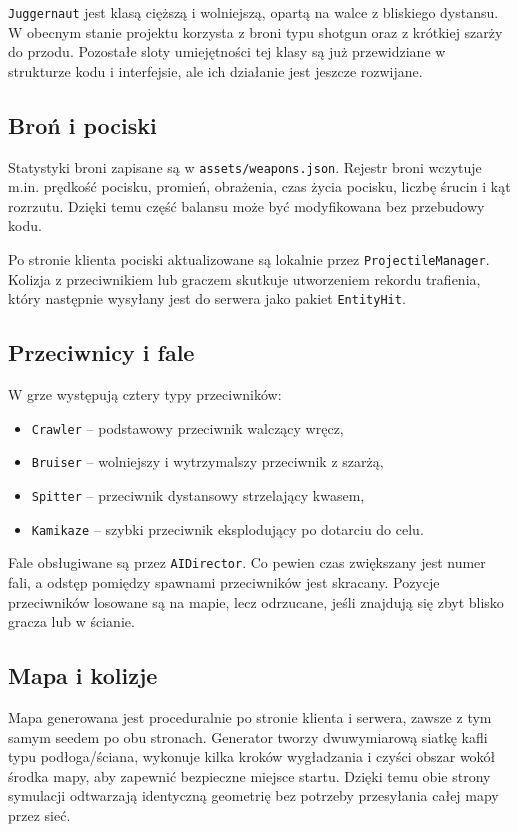 \documentclass[a4paper,12pt]{article}
\begin{document}
\texttt{Juggernaut} jest klasą cięższą i wolniejszą, opartą na walce z bliskiego dystansu. W obecnym stanie projektu korzysta z broni typu shotgun oraz z krótkiej szarży do przodu. Pozostałe sloty umiejętności tej klasy są już przewidziane w strukturze kodu i interfejsie, ale ich działanie jest jeszcze rozwijane.

\subsection{Broń i pociski}
Statystyki broni zapisane są w \texttt{assets/weapons.json}. Rejestr broni wczytuje m.in. prędkość pocisku, promień, obrażenia, czas życia pocisku, liczbę śrucin i kąt rozrzutu. Dzięki temu część balansu może być modyfikowana bez przebudowy kodu.

Po stronie klienta pociski aktualizowane są lokalnie przez \texttt{ProjectileManager}. Kolizja z przeciwnikiem lub graczem skutkuje utworzeniem rekordu trafienia, który następnie wysyłany jest do serwera jako pakiet \texttt{EntityHit}.

\subsection{Przeciwnicy i fale}
W grze występują cztery typy przeciwników:
\begin{itemize}[leftmargin=1.5cm]
    \item \texttt{Crawler} -- podstawowy przeciwnik walczący wręcz,
    \item \texttt{Bruiser} -- wolniejszy i wytrzymalszy przeciwnik z szarżą,
    \item \texttt{Spitter} -- przeciwnik dystansowy strzelający kwasem,
    \item \texttt{Kamikaze} -- szybki przeciwnik eksplodujący po dotarciu do celu.
\end{itemize}

Fale obsługiwane są przez \texttt{AIDirector}. Co pewien czas zwiększany jest numer fali, a odstęp pomiędzy spawnami przeciwników jest skracany. Pozycje przeciwników losowane są na mapie, lecz odrzucane, jeśli znajdują się zbyt blisko gracza lub w ścianie.

\subsection{Mapa i kolizje}
Mapa generowana jest proceduralnie po stronie klienta i serwera, zawsze z tym samym seedem po obu stronach. Generator tworzy dwuwymiarową siatkę kafli typu podłoga/ściana, wykonuje kilka kroków wygładzania i czyści obszar wokół środka mapy, aby zapewnić bezpieczne miejsce startu. Dzięki temu obie strony symulacji odtwarzają identyczną geometrię bez potrzeby przesyłania całej mapy przez sieć.
\end{document}
